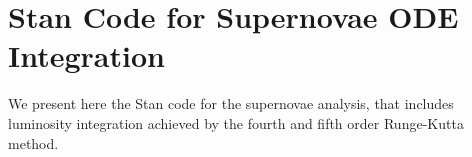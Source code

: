 \chapter{Stan Code for Supernovae ODE Integration}
\label{sec:appendix_stan_ode}

We present here the Stan code for the supernovae analysis, that includes luminosity integration achieved by the fourth and fifth order Runge-Kutta method.

\texttt{}
